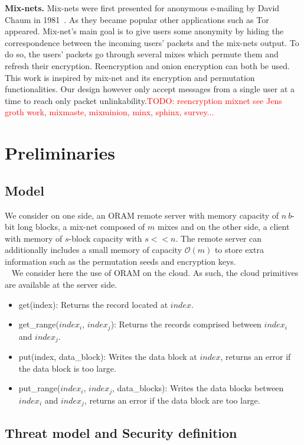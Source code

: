 \documentclass{llncs}
\newcommand{\todo}[1]{\textcolor{red}{TODO: #1}}
\begin{document}
\noindent\textbf{Mix-nets.}
Mix-nets were first presented for anonymous e-mailing by David Chaum in 1981~\cite{xxx}. As they became popular other applications such as Tor~\cite{dingledine2004tor} appeared. Mix-net's main goal is to give users some anonymity by hiding the correspondence between the incoming users' packets and the mix-nets output. To do so, the users' packets go through several mixes which permute them and refresh their encryption. Reencryption and onion encryption can both be used.
This work is inspired by mix-net and its encryption and permutation functionalities. Our design however only accept messages from a single user at a time to reach only packet unlinkability.\todo{reencryption mixnet see Jens groth work, mixmaste, mixminion, minx, sphinx, survey...}
%
\section{Preliminaries}\label{Prelim}
%
\subsection{Model}\label{Model}
We consider on one side, an ORAM remote server with memory capacity of $n\ b$-bit long blocks, a mix-net composed of $m$ mixes and on the other side, a client with memory of $s$-block capacity with $s<<n$. The remote server can additionally includes a small memory of capacity $\mathcal{O}(m)$ to store extra information such as the permutation seeds and encryption keys.\\\
%
We consider here the use of ORAM on the cloud. As such, the cloud primitives are available at the server side. 
\begin{itemize}
 \item get(index): Returns the record located at $index$.
 \item get\_range($index_i$, $index_j$): Returns the records comprised between $index_i$ and $index_j$.
 \item put(index, data\_block):  Writes the data block at $index$, returns an error if the data block is too large.
 \item put\_range($index_i$, $index_j$, data\_blocks): Writes the data blocks between $index_i$ and $index_j$, returns an error if the data block are too large.
\end{itemize}

%
\subsection{Threat model and Security definition}\label{Threat}
\end{document}
